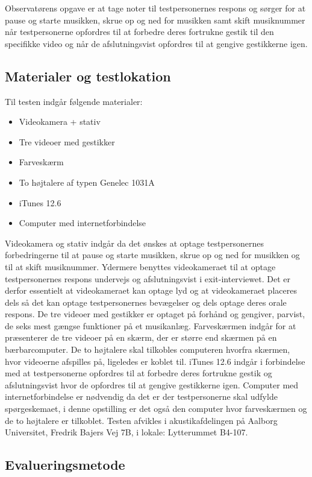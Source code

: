 Observatørens opgave er at tage noter til testpersonernes respons og sørger for at pause og starte musikken, skrue op og ned for musikken samt skift musiknummer når testpersonerne opfordres til at forbedre deres fortrukne gestik til den specifikke video og når de afslutningsvist opfordres til at gengive gestikkerne igen. 

\subsection{Materialer og testlokation}
\label{MaterialeOgTestlokationValgAfGestikker}
%
Til testen indgår følgende materialer:
%
\begin{itemize}
  \item Videokamera + stativ
  \item Tre videoer med gestikker
  \item Farveskærm 
  \item To højtalere af typen Genelec 1031A
  \item iTunes 12.6  
  \item Computer med internetforbindelse\blankline
\end{itemize}
% 
Videokamera og stativ indgår da det ønskes at optage testpersonernes forbedringerne til at pause og starte musikken, skrue op og ned for musikken og til at skift musiknummer. Ydermere benyttes videokameraet til at optage testpersonernes respons undervejs og afslutningsvist i exit-interviewet. Det er derfor essentielt at videokameraet kan optage lyd og at videokameraet placeres dels så det kan optage testpersonernes bevægelser og dels optage deres orale respons. De tre videoer med gestikker er optaget på forhånd og gengiver, parvist, de seks mest gængse funktioner på et musikanlæg. Farveskærmen indgår for at præsenterer de tre videoer på en skærm, der er større end skærmen på en bærbarcomputer. De to højtalere skal tilkobles computeren hvorfra skærmen, hvor videoerne afspilles på, ligeledes er koblet til. iTunes 12.6 indgår i forbindelse med at testpersonerne opfordres til at forbedre deres fortrukne gestik og afslutningsvist hvor de opfordres til at gengive gestikkerne igen. Computer med internetforbindelse er nødvendig da det er der testpersonerne skal udfylde spørgeskemaet, i denne opstilling er det også den computer hvor farveskærmen og de to højtalere er tilkoblet.\blankline
% 
Testen afvikles i akustikafdelingen på Aalborg Universitet, Fredrik Bajers Vej 7B, i lokale: Lytterummet B4-107. 
%
\subsection{Evalueringsmetode}
\label{EvalueringsmetodeValgAfGestikker}

